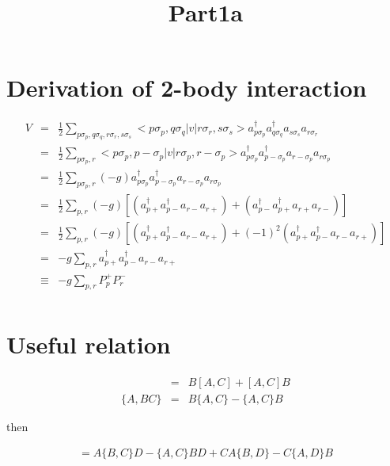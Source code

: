 \documentclass{article}
\title{Part1a}
\date{}
\begin{document}
\maketitle

\section{Derivation of 2-body interaction}

\begin{eqnarray*}
V &=& \frac{1}{2} \sum_{p\sigma_p,q\sigma_q,r\sigma_r,s\sigma_s} <p\sigma_p,q\sigma_q|v|r\sigma_r,s\sigma_s> a_{p \sigma_p}^{\dagger} a_{q \sigma_q}^{\dagger} a_{s \sigma_s} a_{r \sigma_r} \\
 &=& \frac{1}{2} \sum_{p\sigma_p,r} <p\sigma_p,p-\sigma_p|v|r\sigma_p,r-\sigma_p> a_{p \sigma_p}^{\dagger} a_{p -\sigma_p}^{\dagger} a_{r -\sigma_p} a_{r \sigma_p} \\
 &=& \frac{1}{2} \sum_{p\sigma_p,r} (-g) a_{p \sigma_p}^{\dagger} a_{p -\sigma_p}^{\dagger} a_{r -\sigma_p} a_{r \sigma_p} \\
 &=& \frac{1}{2} \sum_{p,r} (-g) \left[ \left( a_{p +}^{\dagger} a_{p -}^{\dagger} a_{r -} a_{r +}  \right) + \left( a_{p -}^{\dagger} a_{p +}^{\dagger} a_{r +} a_{r -} \right) \right] \\
 &=& \frac{1}{2} \sum_{p,r} (-g) \left[ \left( a_{p +}^{\dagger} a_{p -}^{\dagger} a_{r -} a_{r +}  \right) + (-1)^2 \left( a_{p +}^{\dagger} a_{p -}^{\dagger} a_{r -} a_{r +}  \right) \right] \\
 &=& -g \sum_{p,r} a_{p +}^{\dagger} a_{p -}^{\dagger} a_{r -} a_{r +} \\
 &\equiv& -g \sum_{p,r} P_p^{+} P_r^{-} \\
\end{eqnarray*}

\section{Useful relation}
\begin{eqnarray*}
[A,BC] &=& B[A,C] + [A,C]B \\
\bigl\{ A,BC \bigr\} &=& B \bigl\{ A,C \bigr\} - \bigl\{ A,C \bigr\} B
\end{eqnarray*}

then

\begin{eqnarray*}
[AB,CD] = A \bigl\{ B,C \bigr\} D - \bigl\{ A,C \bigr\} B D + C A \bigl\{ B,D \bigr\} - C \bigl\{ A,D \bigr\} B
\end{eqnarray*}
\end{document}
